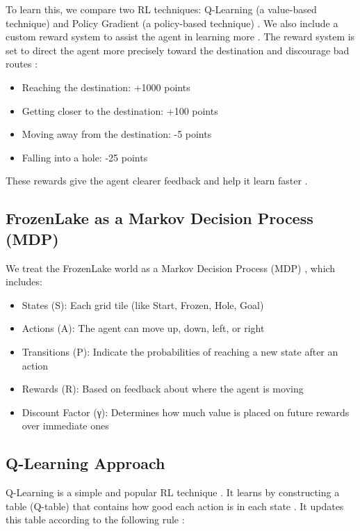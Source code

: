 \documentclass[conference]{IEEEtran}
\begin{document}
To learn this, we compare two RL techniques: Q-Learning (a value-based technique) \cite{Watkins1992} and Policy Gradient (a policy-based technique) \cite{Williams1992}. We also include a custom reward system to assist the agent in learning more \cite{Ng1999}. The reward system is set to direct the agent more precisely toward the destination and discourage bad routes \cite{Devlin2011}:

\begin{itemize}
\item Reaching the destination: +1000 points \cite{Ng1999}
\item Getting closer to the destination: +100 points \cite{Wiewiora2003}
\item Moving away from the destination: -5 points \cite{Devlin2011}
\item Falling into a hole: -25 points \cite{Ng1999}
\end{itemize}

These rewards give the agent clearer feedback and help it learn faster \cite{Ng1999}.

\subsection{FrozenLake as a Markov Decision Process (MDP)}
We treat the FrozenLake world as a Markov Decision Process (MDP) \cite{SuttonBarto2018}, which includes:

\begin{itemize}
\item States (S): Each grid tile (like Start, Frozen, Hole, Goal) \cite{Brockman2016}
\item Actions (A): The agent can move up, down, left, or right \cite{Brockman2016}
\item Transitions (P): Indicate the probabilities of reaching a new state after an action \cite{SuttonBarto2018}
\item Rewards (R): Based on feedback about where the agent is moving \cite{Ng1999}
\item Discount Factor (γ): Determines how much value is placed on future rewards over immediate ones \cite{SuttonBarto2018}
\end{itemize}

\subsection{Q-Learning Approach}
Q-Learning is a simple and popular RL technique \cite{Watkins1992}. It learns by constructing a table (Q-table) that contains how good each action is in each state \cite{Melo2001}. It updates this table according to the following rule \cite{Watkins1992}:
\end{document}
